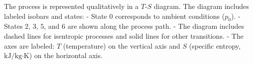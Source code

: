 The process is represented qualitatively in a \( T \)-\( S \) diagram. The diagram includes labeled isobars and states:  
- State \( 0 \) corresponds to ambient conditions (\( p_0 \)).  
- States \( 2 \), \( 3 \), \( 5 \), and \( 6 \) are shown along the process path.  
- The diagram includes dashed lines for isentropic processes and solid lines for other transitions.  
- The axes are labeled: \( T \) (temperature) on the vertical axis and \( S \) (specific entropy, \( \text{kJ/kg·K} \)) on the horizontal axis.